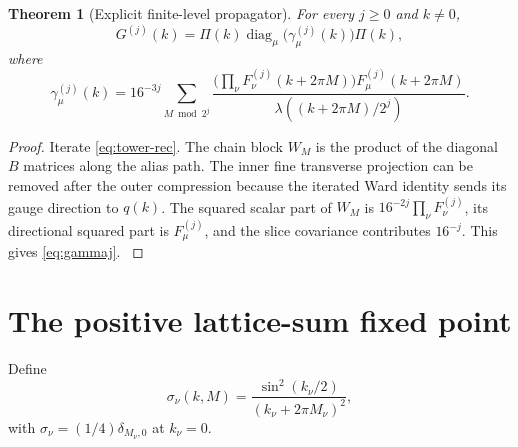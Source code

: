 \documentclass[11pt,oneside,openany]{book}
\newtheorem{theorem}{Theorem}[chapter]
\theoremstyle{definition}
\theoremstyle{remark}
\newcommand{\diag}{\operatorname{diag}}
\newcommand{\src}[2]{\cite[#2]{#1}}
\begin{document}
\begin{theorem}[Explicit finite-level propagator]\label{thm:tower-explicit}
For every $j\ge0$ and $k\ne0$,
\begin{equation}\label{eq:Gj}
G^{(j)}(k)=\Pi(k)\diag_\mu\bigl(\gamma_\mu^{(j)}(k)\bigr)\Pi(k),
\end{equation}
where
\begin{equation}\label{eq:gammaj}
\gamma_\mu^{(j)}(k)=16^{-3j}
\sum_{M\bmod2^j}
\frac{\bigl(\prod_\nu F_\nu^{(j)}(k+2\pi M)\bigr)
F_\mu^{(j)}(k+2\pi M)}
{\lambda((k+2\pi M)/2^j)}.
\end{equation}
\end{theorem}
\begin{proof}
Iterate \cref{eq:tower-rec}. The chain block $W_M$ is the product of the diagonal $B$ matrices along the alias path. The inner fine transverse projection can be removed after the outer compression because the iterated Ward identity sends its gauge direction to $q(k)$. The squared scalar part of $W_M$ is $16^{-2j}\prod_\nu F_\nu^{(j)}$, its directional squared part is $F_\mu^{(j)}$, and the slice covariance contributes $16^{-j}$. This gives \cref{eq:gammaj}. \src{F11}{V37}
\end{proof}

\section{The positive lattice-sum fixed point}
Define
\[
\sigma_\nu(k,M)=\frac{\sin^2(k_\nu/2)}{(k_\nu+2\pi M_\nu)^2},
\]
with $\sigma_\nu=(1/4)\delta_{M_\nu,0}$ at $k_\nu=0$.
\end{document}
